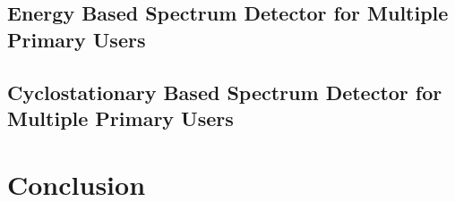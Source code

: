 \documentclass{article}
\begin{document}
\begin{spacing}{2.0}
\subsection{Energy Based Spectrum Detector for Multiple Primary Users}
\subsection{Cyclostationary Based Spectrum Detector for Multiple Primary Users}
\newpage
\section{ Conclusion}
\newpage
\end{spacing}
\end{document}
